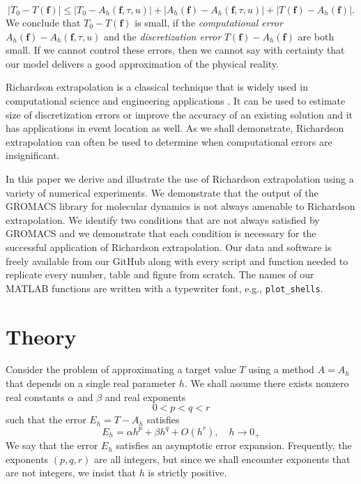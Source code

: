 \documentclass[runningheads]{llncs}
\begin{document}
\begin{equation}
  |T_0 - T(\bm{f}) | \leq  |T_0 - A_h(\bm{f},\tau,u)| + |A_h(\bm{f}) - A_h(\bm{f},\tau,u)| + |T(\bm{f}) - A_h(\bm{f})|.
\end{equation}
We conclude that $T_0 - T(\bm{f})$ is small, if the \emph{computational error} $A_h(\bm{f}) - A_h(\bm{f}, \tau, u)$ and the \emph{discretization error} $T(\bm{f}) - A_h(\bm{f})$ are both small. If we cannot control these errors, then we cannot say with certainty that our model delivers a good approximation of the physical reality.

Richardson extrapolation is a classical technique that is widely used in computational science and engineering applications \cite{roache1998}. It can be used to estimate size of discretization errors or improve the accuracy of an existing solution \cite{zahari2018} and it has applications in event location \cite{mannshardt1978one} as well. As we shall demonstrate, Richardson extrapolation can often be used to determine when computational errors are insignificant.

In this paper we derive and illustrate the use of Richardson extrapolation using a variety of numerical experiments.
We demonstrate that the output of the GROMACS \cite{gromacs2005} library for molecular dynamics is not always amenable to Richardson extrapolation. 
We identify two conditions that are not always satisfied by GROMACS and we demonstrate that each condition is necessary for the successful application of Richardson extrapolation.
Our data and software is freely available from our GitHub \cite{lorien2024ppam} along with every script and function needed to replicate every number, table and figure from scratch. The names of our MATLAB functions are written with a typewriter font, e.g., \texttt{plot\_shells}.

\section{Theory}

Consider the problem of approximating a target value $T$ using a method $A = A_h$ that depends on a single real parameter $h$. We shall assume there exists nonzero real constants $\alpha$ and $\beta$ and real exponents
\begin{equation}
  0 < p < q < r
\end{equation}
such that the error $E_h = T - A_h$ satisfies
\begin{equation} \label{equ:aex}
  E_h  = \alpha h^p + \beta h^q + O(h^r), \quad h \rightarrow 0_+
\end{equation}
We say that the error $E_h$ satisfies an asymptotic error expansion. Frequently, the exponents $(p,q,r)$ are all integers, but since we shall encounter exponents that are not integers, we insist that $h$ is strictly positive.
\end{document}
